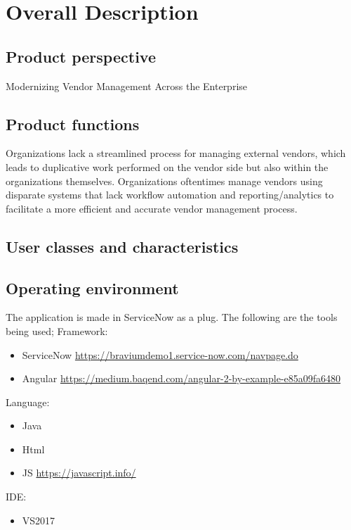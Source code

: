 \documentclass[10pt]{article}
\begin{document}
\section{Overall Description}

\subsection{Product perspective}

Modernizing Vendor Management Across the Enterprise

\subsection{Product functions}

Organizations lack a streamlined process for managing external vendors, which leads to duplicative work performed on the vendor side but also within the organizations themselves. Organizations oftentimes manage vendors using disparate systems that lack workflow automation and reporting/analytics to facilitate a more efficient and accurate vendor management process.

\subsection{User classes and characteristics}

\lipsum[10]

\subsection{Operating environment}

The application is made in ServiceNow as a plug. The following are the tools being used;
Framework:
\begin{itemize}
	\item ServiceNow \url{https://braviumdemo1.service-now.com/navpage.do}
	\item Angular \url{https://medium.baqend.com/angular-2-by-example-e85a09fa6480}
\end{itemize}
Language:
\begin{itemize}
	\item Java
	\item Html
	\item JS \url{https://javascript.info/}
\end{itemize}
IDE:
\begin{itemize}
	\item VS2017
\end{itemize}
\end{document}
